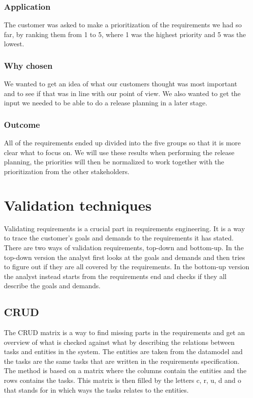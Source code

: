 \documentclass[a4paper]{article}
\begin{document}
		\subsubsection{Application}
			The customer was asked to make a prioritization of the requirements we had so far, by ranking them from 1 to 5, where 1 was the highest priority and 5 was the lowest.
		\subsubsection{Why chosen}
			We wanted to get an idea of what our customers thought was most important and to see if that was in line with our point of view. We also wanted to get the input we needed to be able to do a release planning in a later stage.
		\subsubsection{Outcome}
			All of the requirements ended up divided into the five groups so that it is more clear what to focus on. We will use these results when performing the release planning, the priorities will then be normalized to work together with the prioritization from the other stakeholders.

	\section{Validation techniques}
	Validating requirements is a crucial part in requirements engineering. It is a way to trace the customer's goals and demands to the requirements it has stated. There are two ways of validation requirements, top-down and bottom-up. In the top-down version the analyst first looks at the goals and demands and then tries to figure out if they are all covered by the requirements. In the bottom-up version the analyst instead starts from the requirements end and checks if they all describe the goals and demands.
						
			\subsection{CRUD}
				The CRUD matrix is a way to find missing parts in the requirements and get an overview of what is checked against what by describing the relations between tasks and entities in the system. The entities are taken from the datamodel and the tasks are the same tasks that are written in the requirements specification. The method is based on a matrix where the columns contain the entities and the rows contains the tasks. This matrix is then filled by the letters c, r, u, d and o that stands for in which ways the tasks relates to the entities. 
				
\end{document}
